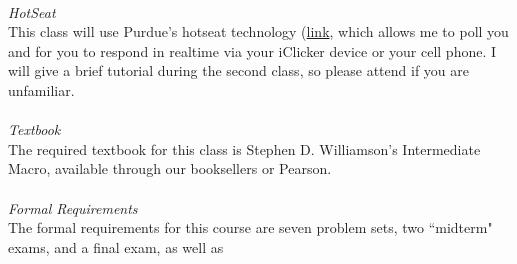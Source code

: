 \documentclass[a4paper]{article}
\begin{document}
\ \\
\emph{HotSeat}\\
This class will use Purdue's hotseat technology (\href{https://www.openhotseat.org/Login?ReturnUrl=https%3a%2f%2fwww.openhotseat.org%2f}{link}, which allows me to poll you and for you to respond in realtime via your iClicker device or your cell phone.   I will give a brief tutorial during the second class, so please attend if you are unfamiliar.   \\
\ \\
\emph{Textbook}\\
The required textbook for this class is Stephen D. Williamson's Intermediate Macro, available through our booksellers or Pearson.  \\
\ \\

\emph{Formal Requirements}\\
The formal requirements for this course are seven problem sets, two ``midterm" exams, and a final exam, as well as 
\end{document}
